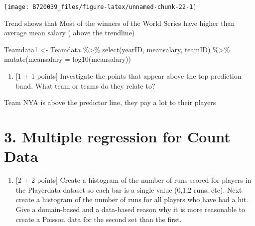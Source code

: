 \documentclass[
]{article}
\newenvironment{Shaded}{\begin{snugshade}}{\end{snugshade}}
\newcommand{\AttributeTok}[1]{\textcolor[rgb]{0.77,0.63,0.00}{#1}}
\newcommand{\DecValTok}[1]{\textcolor[rgb]{0.00,0.00,0.81}{#1}}
\newcommand{\FunctionTok}[1]{\textcolor[rgb]{0.00,0.00,0.00}{#1}}
\newcommand{\NormalTok}[1]{#1}
\newcommand{\OtherTok}[1]{\textcolor[rgb]{0.56,0.35,0.01}{#1}}
\newcommand{\SpecialCharTok}[1]{\textcolor[rgb]{0.00,0.00,0.00}{#1}}
\providecommand{\tightlist}{%
  \setlength{\itemsep}{0pt}\setlength{\parskip}{0pt}}
\begin{document}
\begin{center}\texttt{[image: B720039\_files/figure-latex/unnamed-chunk-22-1]} \end{center}

Trend shows that Most of the winners of the World Series have higher
than average mean salary ( above the trendline)

\begin{Shaded}
\begin{Highlighting}[]
\NormalTok{Teamdata1 }\OtherTok{\textless{}{-}}\NormalTok{ Teamdata }\SpecialCharTok{\%\textgreater{}\%}
  \FunctionTok{select}\NormalTok{(yearID, meansalary, teamID) }\SpecialCharTok{\%\textgreater{}\%}
  \FunctionTok{mutate}\NormalTok{(}\AttributeTok{meansalary =} \FunctionTok{log10}\NormalTok{(meansalary))}
\end{Highlighting}
\end{Shaded}

\begin{enumerate}
\def\labelenumi{\alph{enumi}.}
\setcounter{enumi}{4}
\tightlist
\item
  {[}1 + 1 points{]} Investigate the points that appear above the top
  prediction band. What team or teams do they relate to?
\end{enumerate}

Team NYA is above the predictor line, they pay a lot to their players

\hypertarget{multiple-regression-for-count-data}{%
\section{3. Multiple regression for Count
Data}\label{multiple-regression-for-count-data}}

\begin{enumerate}
\def\labelenumi{\alph{enumi}.}
\tightlist
\item
  {[}2 + 2 points{]} Create a histogram of the number of runs scored for
  players in the Playerdata dataset so each bar is a single value (0,1,2
  runs, etc). Next create a histogram of the number of runs for all
  players who have had a hit. Give a domain-based and a data-based
  reason why it is more reasonable to create a Poisson data for the
  second set than the first.
\end{enumerate}

\begin{Shaded}
\end{Shaded}
\end{document}
